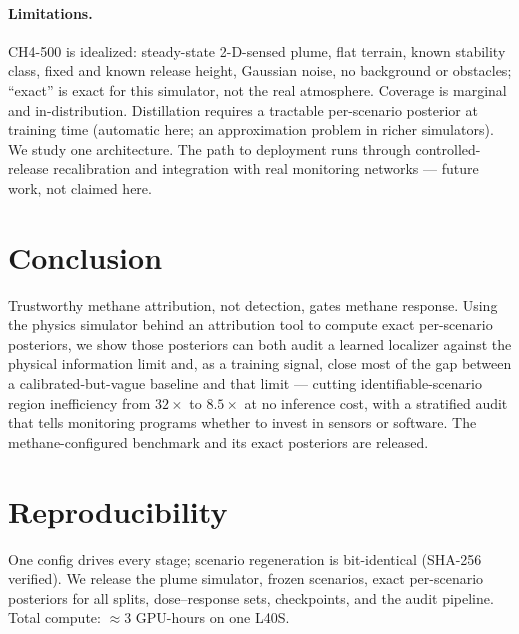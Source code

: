 \documentclass{article}
\begin{document}
\paragraph{Limitations.} CH4-500 is idealized: steady-state 2-D-sensed plume, flat terrain,
known stability class, fixed and known release height, Gaussian noise, no background or
obstacles; ``exact'' is exact for this simulator, not the real atmosphere. Coverage is
marginal and in-distribution. Distillation requires a tractable per-scenario posterior at
training time (automatic here; an approximation problem in richer simulators). We study one
architecture. The path to deployment runs through controlled-release recalibration and
integration with real monitoring networks --- future work, not claimed here.

\section{Conclusion}

Trustworthy methane attribution, not detection, gates methane response. Using the physics
simulator behind an attribution tool to compute exact per-scenario posteriors, we show
those posteriors can both audit a learned localizer against the physical information limit
and, as a training signal, close most of the gap between a calibrated-but-vague baseline and
that limit --- cutting identifiable-scenario region inefficiency from $32\times$ to
$8.5\times$ at no inference cost, with a stratified audit that tells monitoring programs
whether to invest in sensors or software. The methane-configured benchmark and its exact
posteriors are released.

\section*{Reproducibility}
One config drives every stage; scenario regeneration is bit-identical (SHA-256 verified).
We release the plume simulator, frozen scenarios, exact per-scenario posteriors for all
splits, dose--response sets, checkpoints, and the audit pipeline. Total compute:
$\approx 3$ GPU-hours on one L40S.
\end{document}

